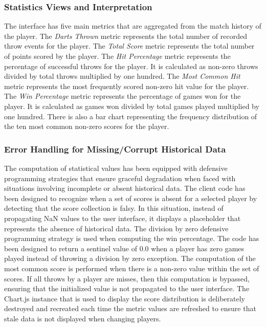 \subsubsection{Statistics Views and Interpretation}
The interface has five main metrics that are aggregated from the match history of the player. The \textit{Darts Thrown} metric represents the total number of recorded throw events for the player. The \textit{Total Score} metric represents the total number of points scored by the player. The \textit{Hit Percentage} metric represents the percentage of successful throws for the player. It is calculated as non-zero throws divided by total throws multiplied by one hundred. The \textit{Most Common Hit} metric represents the most frequently scored non-zero hit value for the player. The \textit{Win Percentage} metric represents the percentage of games won for the player. It is calculated as games won divided by total games played multiplied by one hundred. There is also a bar chart representing the frequency distribution of the ten most common non-zero scores for the player.


\subsubsection{Error Handling for Missing/Corrupt Historical Data}
The computation of statistical values has been equipped with defensive programming strategies that ensure graceful degradation when faced with situations involving incomplete or absent historical data. The client code has been designed to recognize when a set of scores is absent for a selected player by detecting that the score collection is falsy. In this situation, instead of propagating NaN values to the user interface, it displays a placeholder that represents the absence of historical data. The division by zero defensive programming strategy is used when computing the win percentage. The code has been designed to return a sentinel value of 0.0 when a player has zero games played instead of throwing a division by zero exception. The computation of the most common score is performed when there is a non-zero value within the set of scores. If all throws by a player are misses, then this computation is bypassed, ensuring that the initialized value is not propagated to the user interface. The Chart.js instance that is used to display the score distribution is deliberately destroyed and recreated each time the metric values are refreshed to ensure that stale data is not displayed when changing players.

